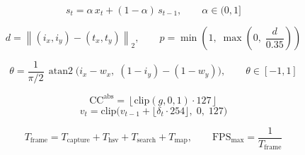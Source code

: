 \begin{equation}
s_t = \alpha\, x_t + (1-\alpha)\, s_{t-1}, \qquad \alpha \in (0,1]
\label{eq:ema}
\end{equation}

\begin{equation}
d = \left\lVert (i_x,i_y) - (t_x,t_y) \right\rVert_2, \qquad
p = \min\!\left(1,\; \max\!\left(0,\; \frac{d}{0.35}\right)\right)
\label{eq:pinch}
\end{equation}

\begin{equation}
\theta = \frac{1}{\pi/2}\,
\operatorname{atan2}\!\big(i_x - w_x,\; (1-i_y) - (1-w_y)\big),
\qquad \theta \in [-1,1]
\label{eq:tilt}
\end{equation}

\begin{equation}
\mathrm{CC}^{\text{abs}} = \left\lfloor \mathrm{clip}(g,0,1)\cdot 127 \right\rfloor
\label{eq:abs}
\end{equation}
\begin{equation}
v_t = \mathrm{clip}\!\big(v_{t-1} + \lfloor \delta_t \cdot 254 \rfloor,\; 0,\; 127\big)
\label{eq:rel}
\end{equation}

\begin{equation}
T_{\text{frame}} = T_{\text{capture}} + T_{\text{hsv}}
                 + T_{\text{search}} + T_{\text{map}},
\qquad
\mathrm{FPS}_{\max} = \frac{1}{T_{\text{frame}}}
\label{eq:latency}
\end{equation}

